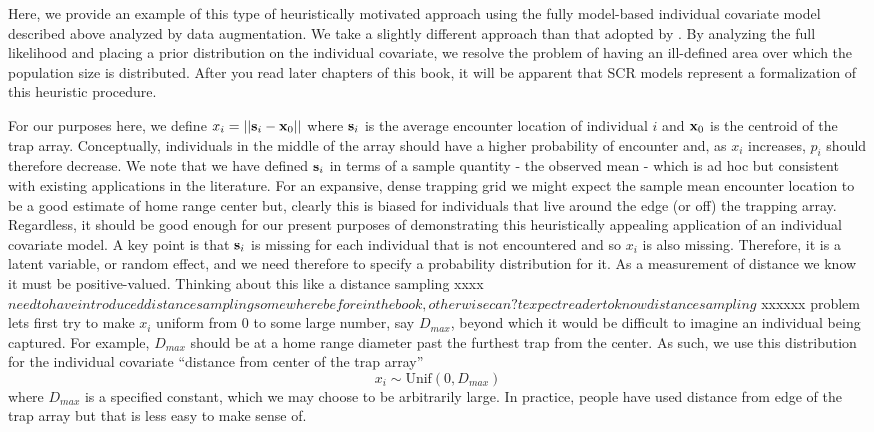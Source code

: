 Here, we provide an example of this type of heuristically motivated
approach using the fully model-based individual covariate model
described above analyzed by data augmentation. We take a slightly
different approach than that adopted by
\citet{boulanger_mclellan:2001}. By analyzing the full likelihood and
placing a prior distribution on the individual covariate, we resolve
the problem of having an ill-defined area over which the population
size is distributed. After you read later chapters of this book, it
will be apparent that SCR models represent a formalization of this
heuristic procedure.

For our purposes here, we define $x_{i} = ||{\bf s}_{i} - {\bf
  x}_{0}||$ where ${\bf s}_{i}$ is the average encounter location of
individual $i$ and ${\bf x}_{0}$ is the centroid of the trap array.
Conceptually, individuals in the middle of the array should have a 
higher probability of encounter and, as $x_{i}$ increases, $p_{i}$
should therefore decrease. We note that we have defined ${\bf s}_{i}$
in terms of a sample quantity - the observed mean - which is ad hoc
but consistent with existing applications in the literature.  For an
expansive, dense trapping grid we might expect the sample mean
encounter location to be a good estimate of home range center but,
clearly this is biased for individuals that live around the edge (or
off) the trapping array. Regardless, it should be good enough for our
present purposes of demonstrating this heuristically appealing
application of an individual covariate model. A key point is that
${\bf s}_{i}$ is missing for each individual that is not encountered
and so  $x_{i}$ is also missing. Therefore, it is a latent variable, or random
effect, and we need therefore to specify a probability distribution
for it.  As a measurement of distance we know it must be
positive-valued. Thinking about this like a distance sampling xxxx $need to have introduced distance sampling somewhere before in the book, otherwise can?t expect reader to know distance sampling$  xxxxxx problem
lets first try to make $x_{i}$ uniform from $0$ to some large number,
say $D_{max}$, beyond which it would be difficult to imagine an
individual being captured. For example, $D_{max}$ should be at a home
range diameter past the furthest trap from the center.  As such, we
use this distribution for the individual covariate ``distance from
center of the trap array''
\[
 x_{i} \sim \mbox{Unif}(0,D_{max})
\]
where $D_{max}$ is a specified constant, which we may choose to be
arbitrarily large.  In practice, people have
used distance from edge of the trap array but that is less easy to
make sense of.


